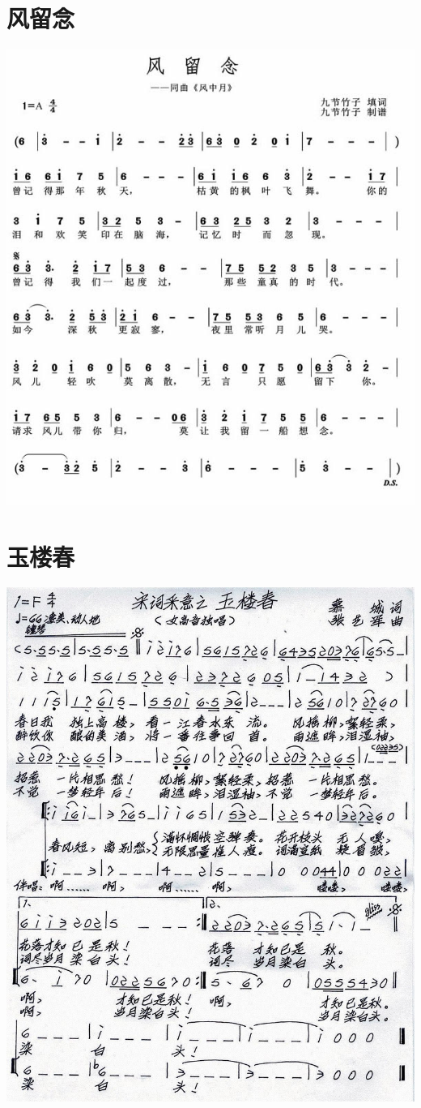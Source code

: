 \documentclass[cn,pad,chinesefont=nofont,twocol]{elegantbook}
\begin{document}
\section{风留念}
    \includegraphics[width=\textwidth]{dongxiao/20200323风留念.jpg}
\section{玉楼春}
    \includegraphics[width=\textwidth]{dongxiao/20200323玉楼春.jpg}
\end{document}
